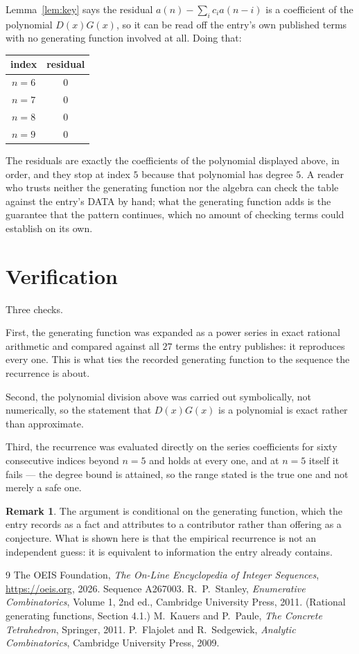 \documentclass[11pt,a4paper]{article}
\theoremstyle{plain}
\theoremstyle{definition}
\newtheorem{remark}[theorem]{Remark}
\begin{document}
Lemma~\ref{lem:key} says the residual $a(n)-\sum_ic_ia(n-i)$ is a coefficient of the
polynomial $D(x)G(x)$, so it can be read off the entry's own published terms with no
generating function involved at all. Doing that:
\begin{center}
\begin{tabular}{cc}
index & residual \\ \hline
$n=6$ & $0$ \\
$n=7$ & $0$ \\
$n=8$ & $0$ \\
$n=9$ & $0$
\end{tabular}
\end{center}
The residuals are exactly the coefficients of the polynomial displayed above, in order, and
they stop at index $5$ because that polynomial has degree $5$. A reader who trusts
neither the generating function nor the algebra can check the table against the entry's DATA
by hand; what the generating function adds is the guarantee that the pattern continues, which
no amount of checking terms could establish on its own.

\section{Verification}

Three checks.

First, the generating function was expanded as a power series in exact rational arithmetic and
compared against all $27$ terms the entry publishes: it reproduces every one. This is
what ties the recorded generating function to the sequence the recurrence is about.

Second, the polynomial division above was carried out symbolically, not numerically, so the
statement that $D(x)G(x)$ is a polynomial is exact rather than approximate.

Third, the recurrence was evaluated directly on the series coefficients for sixty consecutive
indices beyond $n=5$ and holds at every one, and at $n=5$ itself it fails --- the
degree bound is attained, so the range stated is the true one and not merely a safe one.

\begin{remark}
The argument is conditional on the generating function, which the entry records as a fact and
attributes to a contributor rather than offering as a conjecture. What is shown here is that
the empirical recurrence is not an independent guess: it is equivalent to information the
entry already contains.
\end{remark}

\begin{thebibliography}{9}
 The OEIS Foundation, \emph{The On-Line Encyclopedia of Integer
Sequences}, \url{https://oeis.org}, 2026. Sequence A267003.
 R.~P.~Stanley, \emph{Enumerative Combinatorics}, Volume 1, 2nd ed.,
Cambridge University Press, 2011. (Rational generating functions, Section 4.1.)
 M.~Kauers and P.~Paule, \emph{The Concrete Tetrahedron}, Springer, 2011.
 P.~Flajolet and R.~Sedgewick, \emph{Analytic Combinatorics}, Cambridge
University Press, 2009.
\end{thebibliography}
\end{document}
